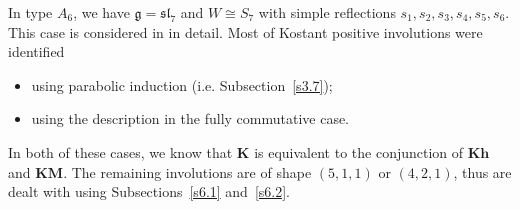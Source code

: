 \documentclass[a4paper]{amsart}
\begin{document}
In type $A_6$, we have $\mathfrak{g}=\mathfrak{sl}_7$
and $W\cong S_7$ with simple reflections $s_1,s_2,s_3,s_4,s_5,s_6$.
This case is considered in \cite{CM} in detail.
Most of Kostant positive involutions were identified
\begin{itemize}
\item using parabolic induction (i.e. Subsection~\ref{s3.7});
\item using the description in the fully commutative case.
\end{itemize}
In both of these cases, we know that $\mathbf{K}$
is equivalent to the conjunction of $\mathbf{Kh}$
and $\mathbf{KM}$. The remaining involutions are of shape $(5,1,1)$ or $(4,2,1)$, thus are dealt with using Subsections~\ref{s6.1} and~\ref{s6.2}.
\end{document}
